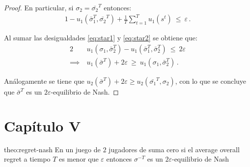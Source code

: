 \begin{proof}
En particular, si $\sigma_2 = \bar{\sigma_2}^T$ entonces:
\begin{alignat}{1}
\label{eq:star2}
-u_1(\bar{\sigma}_1^T, \bar{\sigma_2}^T) + \frac{1}{T} \sum_{t=1}^T u_1(s^t)\ \leq\ \varepsilon \,.
\end{alignat}

Al sumar las desigualdades \ref{eq:star1} y \ref{eq:star2} se obtiene que:
\begin{alignat}{2}
& u_1(\sigma_1, \bar{\sigma}_2^T) - u_1(\bar{\sigma}_1^T, \bar{\sigma}_2^T)\ \leq\ 2\varepsilon \\
\implies\ & u_1(\bar{\sigma}^T) + 2\varepsilon\ \geq\ u_1(\sigma_1, \bar{\sigma}_2^T) \,.
\end{alignat}

Análogamente se tiene que $u_2(\bar{\sigma}^T) + 2\varepsilon \geq u_2(\bar{\sigma_1}^T, \sigma_2)$, con lo que se concluye que $\bar{\sigma}^T$ es un $2\varepsilon$-equilibrio de Nash.
\end{proof}


\section*{Capítulo V}

\begin{reptheorem}{theo:regret-nash}
En un juego de $2$ jugadores de suma cero si el average overall regret a tiempo $T$ es menor que $\varepsilon$ entonces $\sigma^{-T}$ es un $2\varepsilon$-equilibrio de Nash
\end{reptheorem}

